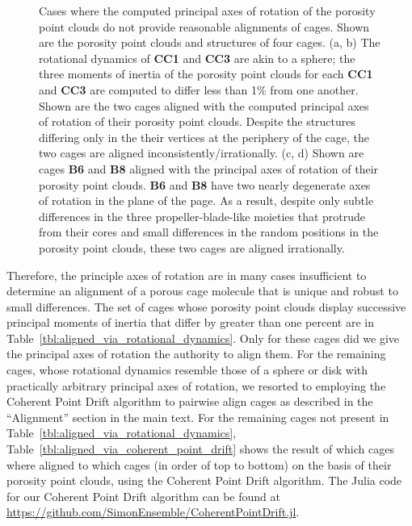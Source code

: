 \documentclass[journal=jacsat,manuscript=article]{achemso}
\begin{document}
{\begin{figure}
	\caption{{\color{red} Cases where the computed principal axes of rotation of the porosity point clouds do not provide reasonable alignments of cages. Shown are the porosity point clouds and structures of four cages. (a, b) The rotational dynamics of \textbf{CC1} and \textbf{CC3} are akin to a sphere; the three moments of inertia of the porosity point clouds for each \textbf{CC1} and \textbf{CC3} are computed to differ less than 1\% from one another. Shown are the two cages aligned with the computed principal axes of rotation of their porosity point clouds. Despite the structures differing only in the their vertices at the periphery of the cage, the two cages are aligned inconsistently/irrationally. (c, d) Shown are cages \textbf{B6} and \textbf{B8} aligned with the principal axes of rotation of their porosity point clouds. \textbf{B6} and \textbf{B8} have two nearly degenerate axes of rotation in the plane of the page. As a result, despite only subtle differences in the three propeller-blade-like moieties that protrude from their cores and small differences in the random positions in the porosity point clouds, these two cages are aligned irrationally.
	}%
	} \label{fig:misaligned}
\end{figure}

Therefore, the principle axes of rotation are in many cases insufficient to determine an alignment of a porous cage molecule that is unique and robust to small differences. The set of cages whose porosity point clouds display successive principal moments of inertia that differ by greater than one percent are in Table~\ref{tbl:aligned_via_rotational_dynamics}. Only for these cages did we give the principal axes of rotation the authority to align them. For the remaining cages, whose rotational dynamics resemble those of a sphere or disk with practically arbitrary principal axes of rotation, we resorted to employing the Coherent Point Drift algorithm to pairwise align cages as described in the ``Alignment'' section in the main text. For the remaining cages not present in Table~\ref{tbl:aligned_via_rotational_dynamics}, Table~\ref{tbl:aligned_via_coherent_point_drift} shows the result of which cages where aligned to which cages (in order of top to bottom) on the basis of their porosity point clouds, using the Coherent Point Drift algorithm. The Julia code for our Coherent Point Drift algorithm can be found at \url{https://github.com/SimonEnsemble/CoherentPointDrift.jl}.


}
\end{document}
